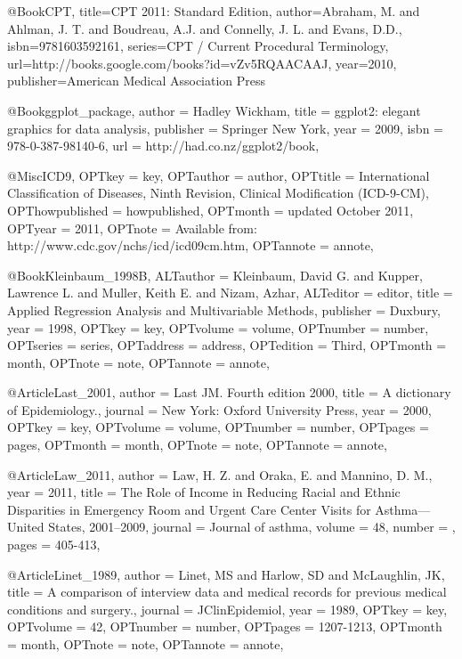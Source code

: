 {{{@Book{CPT,
  title={CPT 2011: Standard Edition},
  author={Abraham, M. and Ahlman, J. T. and Boudreau, A.J. and Connelly, J. L. and Evans, D.D.},
  isbn={9781603592161},
  series={CPT / Current Procedural Terminology},
  url={http://books.google.com/books?id=vZv5RQAACAAJ},
  year={2010},
  publisher={American Medical Association Press}
}


  @Book{ggplot_package,
    author = {Hadley Wickham},
    title = {ggplot2: elegant graphics for data analysis},
    publisher = {Springer New York},
    year = {2009},
    isbn = {978-0-387-98140-6},
    url = {http://had.co.nz/ggplot2/book},
  }
 

@Misc{ICD9,
OPTkey = {key},
OPTauthor = {author},
OPTtitle = {International Classification of Diseases, Ninth Revision, Clinical Modification (ICD-9-CM)},
OPThowpublished = {howpublished},
OPTmonth = {updated October 2011},
OPTyear = {2011},
OPTnote = {Available from: http://www.cdc.gov/nchs/icd/icd09cm.htm},
OPTannote = {annote},
}




@Book{Kleinbaum_1998B,
ALTauthor = {Kleinbaum, David G. and Kupper, Lawrence L. and
Muller, Keith E. and Nizam, Azhar},
ALTeditor = {editor},
title = {Applied Regression Analysis and Multivariable 
Methods},
publisher = {Duxbury},
year = {1998},
OPTkey = {key},
OPTvolume = {volume},
OPTnumber = {number},
OPTseries = {series},
OPTaddress = {address},
OPTedition = {Third},
OPTmonth = {month},
OPTnote = {note},
OPTannote = {annote},
}




@Article{Last_2001,
author = {Last JM. Fourth edition 2000},
title = {A dictionary of Epidemiology.},
journal = {New York: Oxford University Press},
year = {2000},
OPTkey = {key},
OPTvolume = {volume},
OPTnumber = {number},
OPTpages = {pages},
OPTmonth = {month},
OPTnote = {note},
OPTannote = {annote},
}

@Article{Law_2011,
  author = {Law, H. Z. and Oraka, E. and Mannino, D. M.},
  year = {2011},
  title = {The Role of Income in Reducing Racial and Ethnic Disparities in Emergency Room and Urgent Care Center Visits for Asthma—United States, 2001–2009},
  journal = {Journal of asthma},
  volume =  {48},
  number = {},
  pages = {405-413},
}

@Article{Linet_1989,
author = {Linet, MS and Harlow, SD and McLaughlin, JK},
title = {A comparison of interview data and medical records for previous medical conditions and surgery.},
journal = {JClinEpidemiol},
year = {1989},
OPTkey = {key},
OPTvolume = {42},
OPTnumber = {number},
OPTpages = {1207-1213},
OPTmonth = {month},
OPTnote = {note},
OPTannote = {annote},
}


}}}
